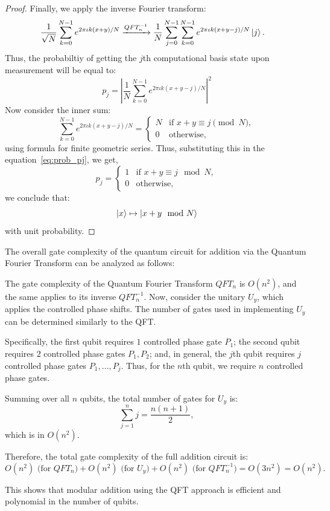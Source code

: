 \begin{proof}
Finally, we apply the inverse Fourier transform:
\begin{align*}
    &\frac{1}{\sqrt{N}} \sum_{k=0}^{N-1} e^{2\pi\iota k(x+y)/N} \xrightarrow{QFT_n^{-1}} 
    \frac{1}{N} \sum_{j=0}^{N-1} \sum_{k=0}^{N-1} e^{2\pi\iota k(x+y-j)/N} \ket{j}.
\end{align*}
Thus, the probabiltiy of getting the $j$th computational basis state upon measurement will be equal to:
\begin{equation}
p_j = |\frac{1}{N}\sum_{k=0}^{N-1}e^{2\pi\iota k(x+y-j)/N}|^2
\label{eq:prob_pj}
\end{equation}
Now consider the inner sum:
\[
\sum_{k=0}^{N-1} e^{2\pi\iota k(x+y-j)/N} = \begin{cases}
    N & \text{if } x+y \equiv j \pmod N, \\
    0 & \text{otherwise},
\end{cases}
\]
using formula for finite geometric series. Thus, substituting this in the equation~\eqref{eq:prob_pj}, we get,
\[
p_j = \begin{cases}
    1 & \text{if } x+y \equiv j \mod N, \\
    0 & \text{otherwise},
\end{cases}
\]
we conclude that:
\[
\ket{x} \mapsto \ket{x+y \mod N}
\]
with unit probability.
\end{proof}
\begin{remark}
    The overall gate complexity of the quantum circuit for addition via the Quantum Fourier Transform can be analyzed as follows:

    The gate complexity of the Quantum Fourier Transform \( QFT_n \) is \( O(n^2) \), and the same applies to its inverse \( QFT_n^{-1} \). Now, consider the unitary \( U_y \), which applies the controlled phase shifts. The number of gates used in implementing \( U_y \) can be determined similarly to the QFT.

    Specifically, the first qubit requires \( 1 \) controlled phase gate \( P_1 \); the second qubit requires \( 2 \) controlled phase gates \( P_1, P_2 \); and, in general, the \( j \)th qubit requires \( j \) controlled phase gates \( P_1, \ldots, P_j \). Thus, for the \( n \)th qubit, we require \( n \) controlled phase gates.

    Summing over all \( n \) qubits, the total number of gates for \( U_y \) is:
    \[
        \sum_{j=1}^{n} j = \frac{n(n+1)}{2},
    \]
    which is in \( O(n^2) \).

    Therefore, the total gate complexity of the full addition circuit is:
    \[
        O(n^2) \text{ (for } QFT_n \text{)} + O(n^2) \text{ (for } U_y \text{)} + O(n^2) \text{ (for } QFT_n^{-1} \text{)} = O(3n^2) = O(n^2).
    \]

    This shows that modular addition using the QFT approach is efficient and polynomial in the number of qubits.
\end{remark}

